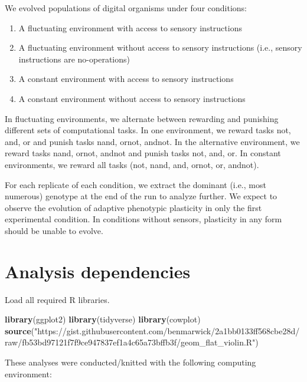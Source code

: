 \documentclass[]{book}
\newenvironment{Shaded}{\begin{snugshade}}{\end{snugshade}}
\newcommand{\KeywordTok}[1]{\textcolor[rgb]{0.13,0.29,0.53}{\textbf{#1}}}
\newcommand{\NormalTok}[1]{#1}
\newcommand{\StringTok}[1]{\textcolor[rgb]{0.31,0.60,0.02}{#1}}
\providecommand{\tightlist}{%
  \setlength{\itemsep}{0pt}\setlength{\parskip}{0pt}}
\begin{document}
We evolved populations of digital organisms under four conditions:

\begin{enumerate}
\def\labelenumi{\arabic{enumi}.}
\tightlist
\item
  A fluctuating environment with access to sensory instructions
\item
  A fluctuating environment without access to sensory instructions (i.e., sensory instructions are no-operations)
\item
  A constant environment with access to sensory instructions
\item
  A constant environment without access to sensory instructions
\end{enumerate}

In fluctuating environments, we alternate between rewarding and punishing different sets of computational tasks.
In one environment, we reward tasks not, and, or and punish tasks nand, ornot, andnot.
In the alternative environment, we reward tasks nand, ornot, andnot and punish tasks not, and, or.
In constant environments, we reward all tasks (not, nand, and, ornot, or, andnot).

For each replicate of each condition, we extract the dominant (i.e., most numerous) genotype at the end of the run to analyze further.
We expect to observe the evolution of adaptive phenotypic plasticity in only the first experimental condition.
In conditions without sensors, plasticity in any form should be unable to evolve.

\hypertarget{analysis-dependencies}{%
\section{Analysis dependencies}\label{analysis-dependencies}}

Load all required R libraries.

\begin{Shaded}
\begin{Highlighting}[]
\KeywordTok{library}\NormalTok{(ggplot2)}
\KeywordTok{library}\NormalTok{(tidyverse)}
\KeywordTok{library}\NormalTok{(cowplot)}
\KeywordTok{source}\NormalTok{(}\StringTok{"https://gist.githubusercontent.com/benmarwick/2a1bb0133ff568cbe28d/raw/fb53bd97121f7f9ce947837ef1a4c65a73bffb3f/geom_flat_violin.R"}\NormalTok{)}
\end{Highlighting}
\end{Shaded}

These analyses were conducted/knitted with the following computing environment:
\end{document}
